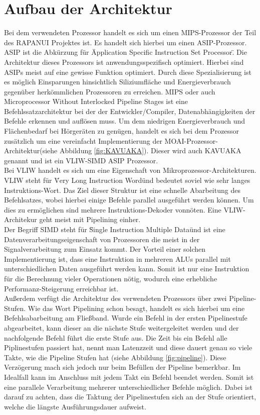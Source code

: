 \section{Aufbau der Architektur}
\label{chap:architecture_overview}
Bei dem verwendeten Prozessor handelt es sich um einen MIPS-Prozessor der Teil des RAPANUI Projektes ist. Es handelt sich hierbei um einen ASIP-Prozessor. ASIP ist die Abkürzung für \"Application Specific Instruction Set Processor\". Die Architektur dieses Prozessors ist anwendungsspezifisch optimiert. Hierbei sind ASIPs meist auf eine gewisse Funktion optimiert. Durch diese Spezialisierung ist es möglich Einsparungen hinsichtlich Siliziumfläche und Energieverbrauch gegenüber herkömmlichen Prozessoren zu erreichen. MIPS oder auch \glqq Microprocessor Without Interlocked Pipeline Stages\grqq{} ist eine Befehlssatzarchitektur bei der der Entwickler/Compiler, Datenabhängigkeiten der Befehle erkennen und auflösen muss.
Um dem niedrigen Energieverbrauch und Flächenbedarf bei Hörgeräten zu genügen, handelt es sich bei dem Prozessor zusätzlich um eine vereinfacht Implementierung der MOAI-Prozessor-Architektur(siehe Abbildung \ref{fig:KAVUAKA}). Dieser wird auch KAVUAKA genannt und ist ein VLIW-SIMD ASIP Prozessor.\\
Bei VLIW  handelt es sich um eine Eigenschaft von Mikroprozessor-Architekturen. VLIW steht für \"Very Long Instruction Word\" und bedeutet soviel wie sehr langes Instruktions-Wort. Das Ziel dieser Struktur ist eine schnelle Abarbeitung des Befehlsatzes, wobei hierbei einige Befehle parallel ausgeführt werden können. Um dies zu ermöglichen sind mehrere Instruktions-Dekoder vonnöten. Eine VLIW-Architekur geht meist mit Pipelining einher.\\
Der Begriff SIMD steht für \"Single Instruction Multiple Data\" und ist eine Datenverarbeitungseigenschaft von Prozessoren die meist in der Signalverarbeitung zum Einsatz kommt. Der Vorteil einer solchen Implementierung ist, dass eine Instruktion in mehreren ALUs parallel mit unterschiedlichen Daten ausgeführt werden kann. Somit ist nur eine Instruktion für die Berechnung vieler Operationen nötig, wodurch eine erhebliche Performanz-Steigerung erreichbar ist.\cite[Seite 249]{wust2010mikroprozessortechnik}\\
Außerdem verfügt die Architektur des verwendeten Prozessors über zwei Pipeline-Stufen.
Wie das Wort Pipelining schon besagt, handelt es sich hierbei um eine Befehlsabarbeitung am Fließband. Wurde ein Befehl in der ersten Pipelinestufe abgearbeitet, kann dieser an die nächste Stufe weitergeleitet werden und der nachfolgende Befehl führt die erste Stufe aus. Die Zeit bis ein Befehl alle Piplinestufen passiert hat, nennt man Latenzzeit und diese dauert genau so viele Takte, wie die Pipeline Stufen hat (siehe Abbildung \ref{fig:pipeline}). Diese Verzögerung mach sich jedoch nur beim Befüllen der Pipeline bemerkbar. Im Idealfall kann im Anschluss mit jedem Takt ein Befehl beendet werden. Somit ist eine parallele Verarbeitung mehrerer unterschiedlicher Befehle möglich. Dabei ist darauf zu achten, dass die Taktung der Pipelinestufen sich an der Stufe orientiert, welche die längste Ausführungsdauer aufweist. \cite[Seite 204]{wust2010mikroprozessortechnik}

